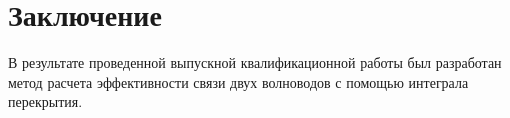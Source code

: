 \chapter*{Заключение}

В результате проведенной выпускной квалификационной работы был разработан метод расчета эффективности связи двух волноводов с помощью интеграла перекрытия.